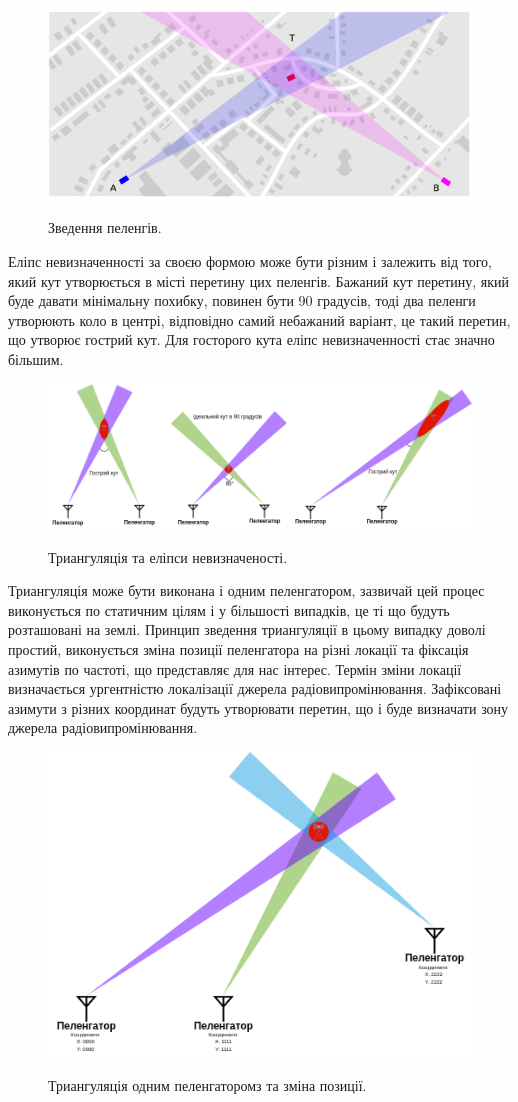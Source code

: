 \documentclass{article}
\begin{document}
\begin{figure}[H]
	\centering
	{\includegraphics[width=0.6\linewidth]{images/df_triangulation.png}}
	\caption{\label{fig:triangulation}Зведення пеленгів.}
\end{figure}

Еліпс невизначенності за своєю формою може бути різним і залежить від того, який кут утворюється в місті перетину цих пеленгів. Бажаний кут перетину, який буде давати мінімальну похибку, повинен бути 90 градусів, тоді два пеленги утворюють коло в центрі, відповідно самий небажаний варіант, це такий перетин, що утворює гострий кут. Для госторого кута еліпс невизначенності стає значно більшим.

\begin{figure}[H]
	\centering
	{\includegraphics[width=0.8\linewidth]{images/triangulation.png}}
	\caption{\label{fig:triangulations} Триангуляція та еліпси невизначеності.}
\end{figure}

Триангуляція може бути виконана і одним пеленгатором, зазвичай цей процес виконується по статичним цілям і у більшості випадків, це ті що будуть розташовані на землі. Принцип зведення триангуляції в цьому випадку доволі простий, виконується зміна позиції пеленгатора на різні локації та фіксація азимутів по частоті, що представляє для нас інтерес. Термін зміни локації визначається ургентністю локалізації джерела радіовипромінювання. Зафіксовані азимути з різних координат будуть утворювати перетин, що і буде визначати зону джерела радіовипромінювання. 

\begin{figure}[H]
	\centering
	{\includegraphics[width=0.5\linewidth]{images/one_device_triangulation.png}}
	\caption{\label{fig:triangulations} Триангуляція одним пеленгаторомз та зміна позиції.}
\end{figure}
\end{document}
